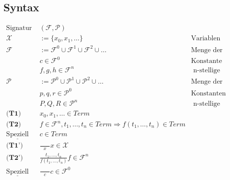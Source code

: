 \documentclass{article}
\begin{document}
		\subsection{Syntax}
			\begin{align*}
				\text{Signatur } & (\mathcal{F, P}) & \\
				\mathcal{X}\ & := \{x_0, x_1, \ldots\} & \text{Variablen}\\
				\mathcal{F}\ & := \mathcal{F}^0 \cup \mathcal{F}^1 \cup \mathcal{F}^2 \cup \ldots & \text{Menge der Funktionen}\\
				& c \in \mathcal{F}^0 & \text{Konstante}\\
				& f, g, h \in \mathcal{F}^n & \text{ n-stellige Funktionssymbole}\\
				\mathcal{P}\ & := \mathcal{P}^0 \cup \mathcal{P}^1 \cup \mathcal{P}^2 \cup \ldots & \text{Menge der Pr\"adikate}\\
				& p, q, r \in \mathcal{P}^0 & \text{Konstanten}\\
				& P, Q, R \in \mathcal{P}^n & \text{ n-stellige Pr\"adikatensymbole}\\\hline
				\textbf{(T1) } &  x_0, x_1, \ldots \in Term& \\
				\textbf{(T2) } & f \in \mathcal{F}^n, t_1, \ldots, t_n \in Term \Rightarrow f(t_1, \ldots, t_n) \in Term & \\
				\underline{\text{Speziell}}\ & c \in Term & \\
				\textbf{(T1') } & \frac{\qquad}{x}  x \in \mathcal{X} & \\
				\textbf{(T2') } & \frac{t_1, \ldots, t_n}{f(t_1, \ldots, t_n)}  f \in \mathcal{F}^n & \\
				\underline{\text{Speziell}}\ & \frac{\qquad}{c} c \in \mathcal{F}^0 & \\
			\end{align*}
\end{document}
